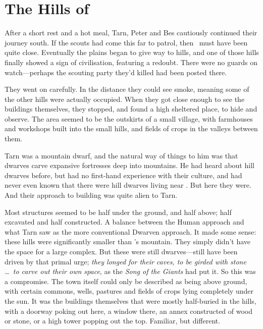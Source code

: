 \chapter{The Hills of \tholkunrond}

After a short rest and a hot meal, Tarn, Peter and Bes cautiously continued their journey south.  If the scouts had come this far to patrol, then \tholkunrond\ must have been quite close.  Eventually the plains began to give way to hills, and one of those hills finally showed a sign of civilisation, featuring a redoubt.  There were no guards on watch---perhaps the scouting party they'd killed had been posted there.

They went on carefully.  In the distance they could see smoke, meaning some of the other hills were actually occupied.  When they got close enough to see the buildings themselves, they stopped, and found a high sheltered place, to hide and observe.  The area seemed to be the outskirts of a small village, with farmhouses and workshops built into the small hills, and fields of crops in the valleys between them.

Tarn was a mountain dwarf, and the natural way of things to him was that dwarves carve expansive fortresses deep into mountains.  He had heard about hill dwarves before, but had no first-hand experience with their culture, and had never even known that there were hill dwarves living near \korbarthrond.  But here they were.  And their approach to building was quite alien to Tarn.

Most structures seemed to be half under the ground, and half above; half excavated and half constructed.  A balance between the Human approach and what Tarn saw as the more conventional Dwarven approach.  It made some sense: these hills were significantly smaller than \korbarthrond's mountain.  They simply didn't have the space for a large complex.  But these were still dwarves---still have been driven by that primal urge; \emph{they longed for their caves, to be girded with stone \ldots\ to carve out their own space}, as the \emph{Song of the Giants} had put it.  So this was a compromise.  The town itself could only be described as being above ground, with certain commons, wells, pastures and fields of crops lying completely under the sun.  It was the buildings themselves that were mostly half-buried in the hills, with a doorway poking out here, a window there, an annex constructed of wood or stone, or a high tower popping out the top.  Familiar, but different.

